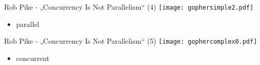 \documentclass[compress]{beamer}
\begin{document}
  \begin{frame}{Rob Pike - „Concurrency Is Not Parallelism“ (4)}
    \texttt{[image: gophersimple2.pdf]}
    \begin{itemize}
      \item parallel
    \end{itemize}
  \end{frame}

  \begin{frame}{Rob Pike - „Concurrency Is Not Parallelism“ (5)}
    \texttt{[image: gophercomplex0.pdf]}
    \begin{itemize}
      \item concurrent
    \end{itemize}
  \end{frame}
\end{document}

